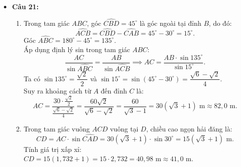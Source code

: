 \documentclass[12pt,a4paper]{article}
\begin{document}
\begin{itemize}[leftmargin=0.6cm, itemsep=2pt, topsep=1pt]
    \item \textbf{Câu 21:}
    \begin{enumerate}[label=\alph*), itemsep=1pt]
        \item Trong tam giác $ABC$, góc $\widehat{CBD} = 45^\circ$ là góc ngoài tại đỉnh $B$, do đó:
        \[
        \widehat{ACB} = \widehat{CBD} - \widehat{CAB} = 45^\circ - 30^\circ = 15^\circ.
        \]
        Góc $\widehat{ABC} = 180^\circ - 45^\circ = 135^\circ$.\\
        Áp dụng định lý sin trong tam giác $ABC$:
        \[
        \dfrac{AC}{\sin \widehat{ABC}} = \dfrac{AB}{\sin \widehat{ACB}} \implies AC = \dfrac{AB \cdot \sin 135^\circ}{\sin 15^\circ}.
        \]
        Ta có $\sin 135^\circ = \dfrac{\sqrt{2}}{2}$ và $\sin 15^\circ = \sin(45^\circ - 30^\circ) = \dfrac{\sqrt{6} - \sqrt{2}}{4}$.\\
        Suy ra khoảng cách từ $A$ đến đỉnh $C$ là:
        \[
        AC = \dfrac{30 \cdot \frac{\sqrt{2}}{2}}{\frac{\sqrt{6} - \sqrt{2}}{4}} = \dfrac{60\sqrt{2}}{\sqrt{6} - \sqrt{2}} = \dfrac{60}{\sqrt{3} - 1} = 30(\sqrt{3} + 1)\text{ m} \approx 82,0\text{ m}.
        \]
        \item Trong tam giác vuông $ACD$ vuông tại $D$, chiều cao ngọn hải đăng là:
        \[
        CD = AC \cdot \sin \widehat{CAD} = 30(\sqrt{3} + 1) \cdot \sin 30^\circ = 15(\sqrt{3} + 1)\text{ m}.
        \]
        Tính giá trị xấp xỉ: $CD = 15(1{,}732 + 1) = 15 \cdot 2{,}732 = 40{,}98\text{ m} \approx 41{,}0\text{ m}$.
    \end{enumerate}


\end{itemize}
\end{document}
